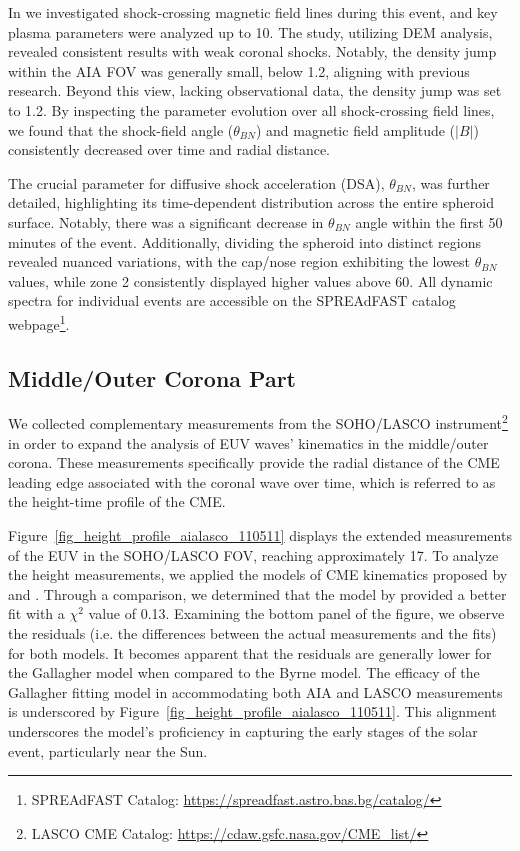 In \citet{kozarev_2022} we investigated shock-crossing magnetic field lines during this event, and key plasma parameters were analyzed up to 10\rsun. The study, utilizing DEM analysis, revealed consistent results with weak coronal shocks. Notably, the density jump within the AIA FOV was generally small, below 1.2, aligning with previous research. Beyond this view, lacking observational data, the density jump was set to 1.2.
By inspecting the parameter evolution over all shock-crossing field lines, we found that the shock-field angle ($\theta_{BN}$) and magnetic field amplitude ($|B|$) consistently decreased over time and radial distance.

The crucial parameter for diffusive shock acceleration (DSA), $\theta_{BN}$, was further detailed, highlighting its time-dependent distribution across the entire spheroid surface. Notably, there was a significant decrease in $\theta_{BN}$ angle within the first 50 minutes of the event. Additionally, dividing the spheroid into distinct regions revealed nuanced variations, with the cap/nose region exhibiting the lowest $\theta_{BN}$ values, while zone 2 consistently displayed higher values above 60\degree. All dynamic spectra for individual events are accessible on the SPREAdFAST catalog webpage\footnote{SPREAdFAST Catalog: \url{https://spreadfast.astro.bas.bg/catalog/}}.

\subsection{Middle/Outer Corona Part}
We collected complementary measurements from the SOHO/LASCO instrument\footnote{LASCO CME Catalog: \url{https://cdaw.gsfc.nasa.gov/CME_list/}} in order to expand the analysis of EUV waves' kinematics in the middle/outer corona. These measurements specifically provide the radial distance of the CME leading edge associated with the coronal wave over time, which is referred to as the height-time profile of the CME.

Figure~\ref{fig_height_profile_aialasco_110511} displays the extended measurements of the EUV in the SOHO/LASCO FOV, reaching approximately 17\rsun. To analyze the height measurements, we applied the models of CME kinematics proposed by \citet{gallagher_2003} and \citet{byrne_2013}. Through a comparison, we determined that the model by \citet{gallagher_2003} provided a better fit with a $\chi^2$ value of 0.13. Examining the bottom panel of the figure, we observe the residuals (i.e. the differences between the actual measurements and the fits) for both models. It becomes apparent that the residuals are generally lower for the Gallagher model when compared to the Byrne model.
The efficacy of the Gallagher fitting model in accommodating both AIA and LASCO measurements is underscored by Figure~\ref{fig_height_profile_aialasco_110511}. This alignment underscores the model's proficiency in capturing the early stages of the solar event, particularly near the Sun.

